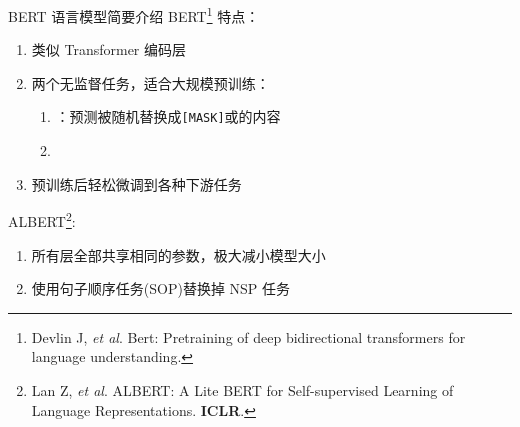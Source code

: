 \begin{frame}[c]{BERT 语言模型}{简要介绍}
	BERT\footnote{{\fontsize{7}{7} \selectfont Devlin J, \textit{et al}. Bert: Pre­training of deep bidirectional transformers for language understanding.}} 特点：
	\begin{enumerate}
		\item 类似 Transformer 编码层
		\item 两个无监督任务，适合大规模预训练：
		\begin{enumerate}
			\item {}：预测被随机替换成\texttt{[MASK]}或的内容
			\item {}
		\end{enumerate}
		\item 预训练后轻松微调到各种下游任务
	\end{enumerate}

	ALBERT\footnote{{\fontsize{7}{7} \selectfont Lan Z, \textit{et al}. ALBERT: A Lite BERT for Self-­supervised Learning of Language Representations. \textbf{ICLR}.}}:
	\begin{enumerate}
		\item 所有层全部共享相同的参数，极大减小模型大小
		\item 使用句子顺序任务(SOP)替换掉 NSP 任务
	\end{enumerate}
\end{frame}

